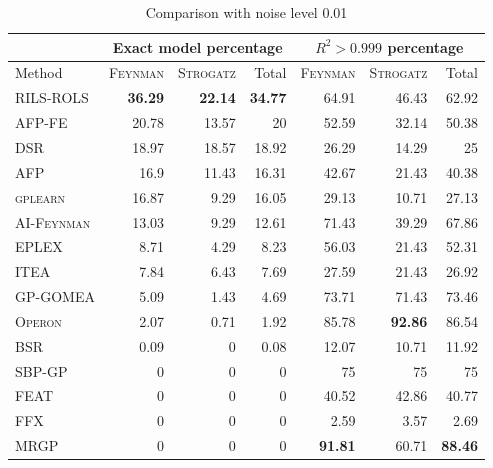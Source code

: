 \documentclass{bmcart}
\begin{document}
\begin{table}[!h]
	\caption{Comparison with noise level 0.01}\label{tab:comp_noise001}
	\centering
	\begin{tabular}{l|rrr|rrr} \hline
		& \multicolumn{3}{c|}{Exact model percentage} & \multicolumn{3}{c}{$R^2 > 0.999$ percentage}\\ \hline
		Method & \textsc{Feynman} & \textsc{Strogatz} & Total & \textsc{Feynman} & \textsc{Strogatz} & Total \\ \hline
		\textsc{RILS-ROLS}&\bf{36.29}&\bf{22.14}&\bf{34.77}&64.91&46.43&62.92\\
		\textsc{AFP-FE}&20.78&13.57&20&52.59&32.14&50.38\\
		\textsc{DSR}&18.97&18.57&18.92&26.29&14.29&25\\
		\textsc{AFP}&16.9&11.43&16.31&42.67&21.43&40.38\\
		\textsc{gplearn}&16.87&9.29&16.05&29.13&10.71&27.13\\
		\textsc{AI-Feynman}&13.03&9.29&12.61&71.43&39.29&67.86\\
		\textsc{EPLEX}&8.71&4.29&8.23&56.03&21.43&52.31\\
		\textsc{ITEA}&7.84&6.43&7.69&27.59&21.43&26.92\\
		\textsc{GP-GOMEA}&5.09&1.43&4.69&73.71&71.43&73.46\\
		\textsc{Operon}&2.07&0.71&1.92&85.78&\bf{92.86}&86.54\\
		\textsc{BSR}&0.09&0&0.08&12.07&10.71&11.92\\
		\textsc{SBP-GP}&0&0&0&75&75&75\\
		\textsc{FEAT}&0&0&0&40.52&42.86&40.77\\
		\textsc{FFX}&0&0&0&2.59&3.57&2.69\\
		\textsc{MRGP}&0&0&0&\bf{91.81}&60.71&\bf{88.46}\\
		\hline
	\end{tabular}
\end{table}
\end{document}
